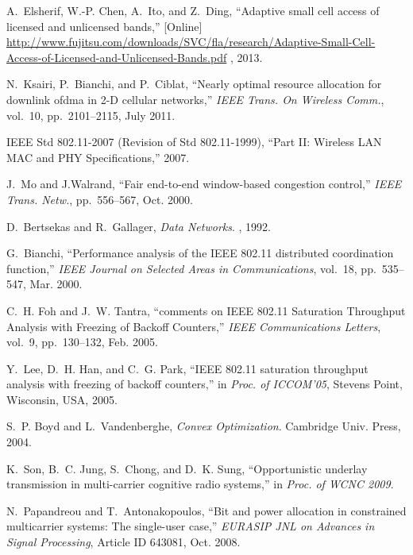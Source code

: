 \documentclass[journal,final,letterpaper,10pt,doublecolumn,twoside]{IEEEtran}
\begin{document}
\begin{thebibliography}{10}
A.~Elsherif, W.-P. Chen, A.~Ito, and Z.~Ding, ``Adaptive small cell access of
  licensed and unlicensed bands,'' [Online]
  \url{http://www.fujitsu.com/downloads/SVC/fla/research/Adaptive-Small-Cell-Access-of-Licensed-and-Unlicensed-Bands.pdf}
  , 2013.

N.~Ksairi, P.~Bianchi, and P.~Ciblat, ``Nearly optimal resource allocation for
  downlink ofdma in {2-D} cellular networks,'' {\em {IEEE Trans. On Wireless
  Comm.}}, vol.~10, pp.~2101--2115, July 2011.

{IEEE Std 802.11-2007 (Revision of Std 802.11-1999)}, ``{Part II: Wireless LAN
  MAC and PHY Specifications},'' 2007.

J.~Mo and J.Walrand, ``Fair end-to-end window-based congestion control,'' {\em
  {IEEE Trans. Netw.}}, pp.~556--567, Oct. 2000.

D.~Bertsekas and R.~Gallager, {\em Data Networks}.
, 1992.

G.~Bianchi, ``{Performance analysis of the IEEE 802.11 distributed coordination
  function},'' {\em {IEEE Journal on Selected Areas in Communications}},
  vol.~18, pp.~535--547, Mar. 2000.

C.~H. Foh and J.~W. Tantra, ``{comments on IEEE 802.11 Saturation Throughput
  Analysis with Freezing of Backoff Counters},'' {\em {IEEE Communications
  Letters}}, vol.~9, pp.~130--132, Feb. 2005.

Y.~Lee, D.~H. Han, and C.~G. Park, ``{IEEE 802.11 saturation throughput
  analysis with freezing of backoff counters},'' in {\em Proc. of ICCOM'05},
  Stevens Point, Wisconsin, USA, 2005.

S.~P. Boyd and L.~Vandenberghe, {\em Convex Optimization}.
\newblock Cambridge Univ. Press, 2004.

K.~Son, B.~C. Jung, S.~Chong, and D.~K. Sung, ``Opportunistic underlay
  transmission in multi-carrier cognitive radio systems,'' in {\em Proc. of
  WCNC 2009}.

N.~Papandreou and T.~Antonakopoulos, ``Bit and power allocation in constrained
  multicarrier systems: The single-user case,'' {\em EURASIP JNL on Advances in
  Signal Processing}, Article ID 643081, Oct. 2008.


\end{thebibliography}
\end{document}
